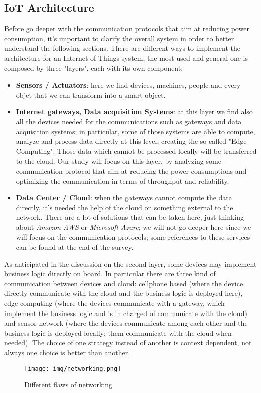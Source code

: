 \documentclass[sigconf]{acmart}
\begin{document}
    \subsection{IoT Architecture}
    Before go deeper with the communication protocols that aim at reducing power consumption, it's important to clarify the overall system in order to better understand the following sections. There are different ways to implement the architecture for an Internet of Things system, the most used and general one is composed by three "layers", each with its own component:
    \begin{itemize}
     \item \textbf{Sensors / Actuators}: here we find devices, machines, people and every objet that we can transform into a smart object. 
      \item \textbf{Internet gateways, Data acquisition Systems}: at this layer we find also all the devices needed for the communications such as gateways and data acquisition systems; in particular, some of those systems are able to compute, analyze and process data directly at this level, creating the so called "Edge Computing". Those data which cannot be processed locally will be transferred to the cloud. Our study will focus on this layer, by analyzing some communication protocol that aim at reducing the power consumptions and optimizing the communication in terms of throughput and reliability. 
        \item \textbf{Data Center / Cloud}: when the gateways cannot compute the data directly, it's needed the help of the cloud on something external to the network. There are a lot of solutions that can be taken here, just thinking about \textit{Amazon AWS} or \textit{Microsoft Azure}; we will not go deeper here since we will focus on the communication protocols; some references to these services can be found at the end of the survey.
    \end{itemize}
    As anticipated in the discussion on the second layer, some devices may implement business logic directly on board. In particular there are three kind of communication between devices and cloud: cellphone based (where the device directly communicate with the cloud and the business logic is deployed here), edge computing (where the devices communicate with a gateway, which implement the business logic and is in charged of communicate with the cloud) and sensor network (where the devices communicate among each other and the business logic is deployed locally; them communicate with the cloud when needed). The choice of one strategy instead of another is context dependent, not always one choice is better than another.
    \begin{figure}[h!]
        \texttt{[image: img/networking.png]}
        \caption{Different flaws of networking}
        \label{fig:networking}
    \end{figure}
\end{document}
